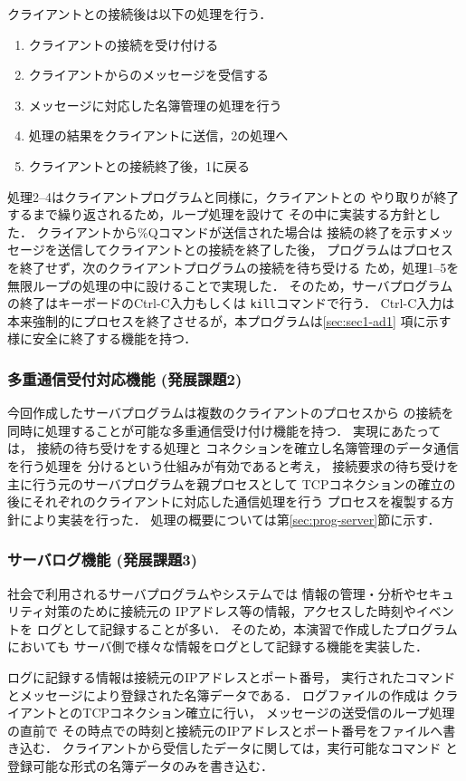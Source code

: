 クライアントとの接続後は以下の処理を行う．
\begin{enumerate}
  \item クライアントの接続を受け付ける
  \item クライアントからのメッセージを受信する
  \item メッセージに対応した名簿管理の処理を行う
  \item 処理の結果をクライアントに送信，2の処理へ
  \item クライアントとの接続終了後，1に戻る
\end{enumerate}
処理2--4はクライアントプログラムと同様に，クライアントとの
やり取りが終了するまで繰り返されるため，ループ処理を設けて
その中に実装する方針とした．
クライアントから\%Qコマンドが送信された場合は
接続の終了を示すメッセージを送信してクライアントとの接続を終了した後，
プログラムはプロセスを終了せず，次のクライアントプログラムの接続を待ち受ける
ため，処理1--5を無限ループの処理の中に設けることで実現した．
そのため，サーバプログラムの終了はキーボードのCtrl-C入力もしくは
\verb|kill|コマンドで行う．
Ctrl-C入力は本来強制的にプロセスを終了させるが，本プログラムは\ref{sec:sec1-ad1}
項に示す様に安全に終了する機能を持つ．


\subsubsection{多重通信受付対応機能 (発展課題2)} \label{sec:ad2-multi}
今回作成したサーバプログラムは複数のクライアントのプロセスから
の接続を同時に処理することが可能な多重通信受け付け機能を持つ．
実現にあたっては，
接続の待ち受けをする処理と
コネクションを確立し名簿管理のデータ通信を行う処理を
分けるという仕組みが有効であると考え，
接続要求の待ち受けを主に行う元のサーバプログラムを親プロセスとして
TCPコネクションの確立の後にそれぞれのクライアントに対応した通信処理を行う
プロセスを複製する方針により実装を行った．
処理の概要については第\ref{sec:prog-server}節に示す．

\subsubsection{サーバログ機能 (発展課題3)} \label{sec:ad3-log}
社会で利用されるサーバプログラムやシステムでは
情報の管理・分析やセキュリティ対策のために接続元の
IPアドレス等の情報，アクセスした時刻やイベントを
ログとして記録することが多い．
そのため，本演習で作成したプログラムにおいても
サーバ側で様々な情報をログとして記録する機能を実装した．

ログに記録する情報は接続元のIPアドレスとポート番号，
実行されたコマンドとメッセージにより登録された名簿データである．
ログファイルの作成は
クライアントとのTCPコネクション確立に行い，
メッセージの送受信のループ処理の直前で
その時点での時刻と接続元のIPアドレスとポート番号をファイルへ書き込む．
クライアントから受信したデータに関しては，実行可能なコマンド
と登録可能な形式の名簿データのみを書き込む．

